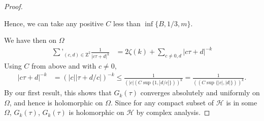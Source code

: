\documentclass[11pt]{article}
\theoremstyle{plain}
\theoremstyle{definition}
\theoremstyle{example}
\theoremstyle{remark}
\theoremstyle{lemma}
\theoremstyle{proposition}
\theoremstyle{Problem}
\theoremstyle{Solution}
\theoremstyle{theorem}
\theoremstyle{corollary}
\begin{document}
\begin{proof}
\begin{enumerate}
\end{enumerate}

Hence, we can take any positive $C$ less than $\inf \{B, 1 / 3, m\}$.

We have then on $\Omega$ \begin{align*}
\sum’_{(c,d)\in \mathrm{Z}^2}\frac{1}{|c\tau +d|^k}&=2\zeta (k)+\sum_{c \neq 0, d}|c \tau+d|^{-k}
\end{align*}
Using $C$ from above and with $c\neq0$, \begin{align*} |c \tau+d|^{-k}&=(|c||\tau+d/c|)^{-k}\leq \frac{1}{(|c|(C\sup\{1,|d/c|\}))^{k}}=\frac{1}{((C\sup\{|c|,|d|\}))^{k}}.
\end{align*}
By our first result, this shows that $G_k(\tau)$ converges absolutely and uniformly on $\Omega$, and hence is holomorphic on $\Omega$. Since for any compact subset of $\mathcal{H}$ is in some $\Omega$, $G_k(\tau)$, $G_k(\tau)$ is holomorphic on $\mathcal{H}$ by complex analysis. 
\end{proof}
\end{document}
